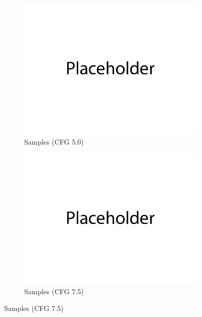 \documentclass{article}
\begin{document}
\begin{figure}[H]
\begin{subfigure}{0.45\textwidth}
        \centering
        \includegraphics[width=\textwidth]{figures/q3_c_samples_cfg5.0.png}
        \caption{Samples (CFG 5.0)}
    \end{subfigure}
    \begin{subfigure}{0.45\textwidth}
        \centering
        \includegraphics[width=\textwidth]{figures/q3_c_samples_cfg7.5.png}
        \caption{Samples (CFG 7.5)}
    \end{subfigure}
\end{figure}
\end{document}
